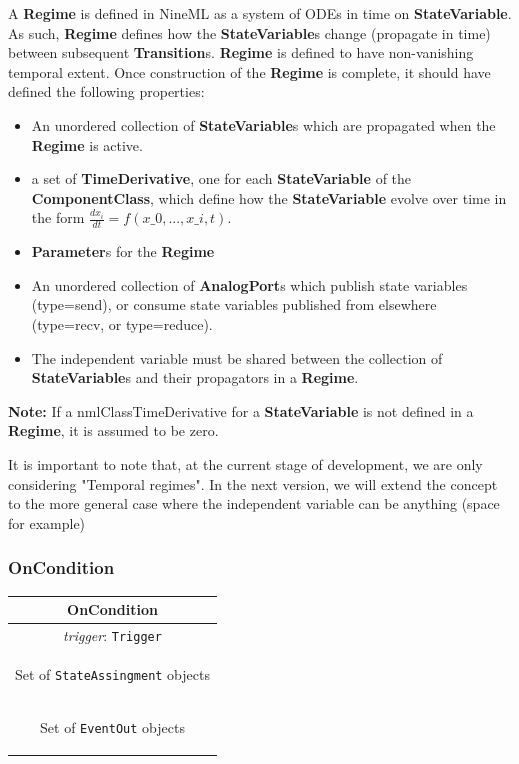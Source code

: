 \documentclass{article}
\newcommand{\note}[1]{%
\begin{center}
\colorbox{issuecolor}{\parbox{0.8\linewidth}{\textbf{Note:} #1}}
\end{center}%
}
\newcommand{\nmlClass}[1]{{\bf #1}}
\newcommand{\ComponentClass}{{\bf{ComponentClass}}\xspace}
\newcommand{\StateVariable}{{\bf{StateVariable}}\xspace}
\newcommand{\StateVariables}{{\bf{StateVariable}}s\xspace}
\newcommand{\TimeDerivative}{{\bf{TimeDerivative}}\xspace}
\newcommand{\Regime}{{\bf{Regime}}\xspace}
\newcommand{\Transitions}{{\bf{Transition}}s\xspace}
\begin{document}
A \nmlClass{Regime} is defined in NineML as a system of ODEs in time
on \StateVariable.  As such, \Regime defines how the \StateVariables
change (propagate in time) between subsequent \Transitions. \Regime is
defined to have non-vanishing temporal extent. Once construction of
the \Regime is complete, it should have defined the following
properties:

\begin{itemize}
\item An unordered collection of \nmlClass{StateVariable}s which are
propagated when the \nmlClass{Regime} is active.
\item a set of \TimeDerivative, one for each \StateVariable
of the \ComponentClass, which define how the \StateVariable
evolve over time in the form $\frac{dx_{i}}{dt} = f(x\_0, ..., x\_i, t)$.
\item \nmlClass{Parameter}s for the \nmlClass{Regime}
\item An unordered collection of \nmlClass{AnalogPort}s which publish state
variables (type=send), or consume state variables published from elsewhere
(type=recv, or type=reduce).
\item The independent variable must be shared between the collection
of \nmlClass{StateVariable}s and their propagators in a \Regime.
\end{itemize}

\note{If a nmlClass{TimeDerivative} for a \StateVariable is not defined
in a \Regime, it is assumed to be zero.}

It is important to note that, at the current stage of development, we are only
considering "Temporal regimes". In the next version, we will extend the concept
to the more general case where the independent variable can be anything (space
for example)

\subsubsection{OnCondition}


\begin{table}[htb]
\center
\begin{tabular}{|c|}
\hline
\hline
OnCondition \\
\hline
\hline
{\em trigger}: {\tt Trigger} \\
\hline
\colorbox{issuecolor}{\parbox{0.4\linewidth}
{\center Set of {\tt StateAssingment} objects}} \\
\hline
\colorbox{issuecolor}{\parbox{0.4\linewidth}
{\center Set of {\tt EventOut} objects}} \\
\hline
\end{tabular}
\end{table}
\end{document}
